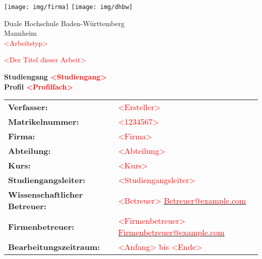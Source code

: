 \documentclass[fontsize=12pt,listof=totoc]{scrreprt}
\makeatletter
\newcommand{\Ersteller}{\textcolor{red}{<Ersteller>}}
\newcommand{\Kurs}{\textcolor{red}{<Kurs>}}
\newcommand{\Studiengang}{\textcolor{red}{<Studiengang>}}
\newcommand{\Profilfach}{\textcolor{red}{<Profilfach>}}
\newcommand{\Titel}{\textcolor{red}{<Der Titel dieser Arbeit>}}
\newcommand{\Arbeitstyp}{\textcolor{red}{<Arbeitstyp>}}
\newcommand{\Matrikelnummer}{\textcolor{red}{<1234567>}}
\newcommand{\Firma}{\textcolor{red}{<Firma>}}
\newcommand{\Abteilung}{\textcolor{red}{<Abteilung>}}
\newcommand{\Studiengangsleiter}{\textcolor{red}{<Studiengangsleiter>}}
\newcommand{\DHBetreuer}{\textcolor{red}{<Betreuer>}}
\newcommand{\DHBetreuerEmail}{\textcolor{red}{Betreuer@example.com}}
\newcommand{\Betreuer}{\textcolor{red}{<Firmenbetreuer>}}
\newcommand{\BetreuerEmail}{\textcolor{red}{Firmenbetreuer@example.com}}
\newcommand{\Zeitraum}{\textcolor{red}{<Anfang> bis <Ende>}}
\newif\ifsperr
\newif\ifroman
\makeatother
\begin{document}
	\ifroman
		\pagenumbering{Roman}
	\fi
	\hypertarget{top}{}
	\bookmark[dest=top]{\Titel}
	\begin{titlepage}
		\texttt{[image: img/firma]}
		\hfill
		\texttt{[image: img/dhbw]}
		\begin{center}
			\large{Duale Hochschule Baden-Württemberg\\
			Mannheim}\\
			\Arbeitstyp\\
			\vspace{20px}
			\begin{onehalfspace}
				{\LARGE\sffamily\Titel\\}
			\end{onehalfspace}
			\vspace{30px}
			\normalsize
			\textbf{Studiengang \Studiengang}\\
			\textbf{\small{Profil \Profilfach}}\\
			\ifsperr
				\textcolor{red}{\textbf{-Sperrvermerk-}}\\
			\fi
			\vfill
		\end{center}
		\begin{tabular}{ll}
			\textbf{Verfasser:} & \Ersteller\\
			\textbf{Matrikelnummer:} & \Matrikelnummer\\
			\textbf{Firma:} & \Firma\\
			\textbf{Abteilung:} & \Abteilung\\
			\textbf{Kurs:} & \Kurs\\
			\textbf{Studiengangsleiter:} & \Studiengangsleiter \\
			\textbf{Wissenschaftlicher Betreuer:} & \DHBetreuer{} \flq{}\href{mailto:\plainDHBetreuerEmail}{\DHBetreuerEmail}\frq{}\\
			\textbf{Firmenbetreuer:} & \Betreuer{} \flq{}\href{mailto:\plainBetreuerEmail}{\BetreuerEmail}\frq{}\\
			\textbf{Bearbeitungszeitraum:} & \Zeitraum\\
		\end{tabular}
	\end{titlepage}
	
	\ifsperr
		\newpage
		\hypertarget{nda}{}
		\thispagestyle{scrplain}
\end{document}
